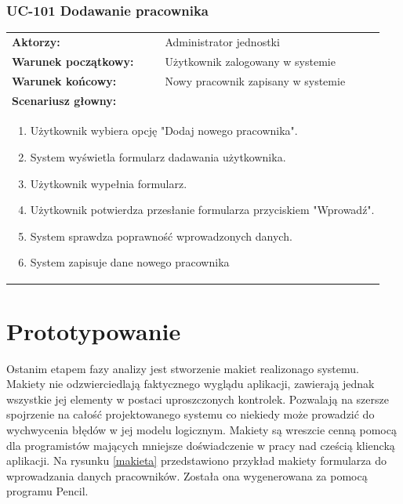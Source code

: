 \subsubsection{UC-101 Dodawanie pracownika}
\begin{tabular}{ll}
	\textbf{Aktorzy:} & Administrator jednostki \\
	
	\textbf{Warunek początkowy:} & Użytkownik zalogowany w systemie \\
	\textbf{Warunek końcowy:} & Nowy pracownik zapisany w systemie \\
	\multicolumn{2}{l}{\textbf{Scenariusz głowny:}}\\
	\multicolumn{2}{l}{
	\begin{minipage}{\textwidth}\begin{enumerate}
		\item Użytkownik wybiera opcję "Dodaj nowego pracownika".
		\item System wyświetla formularz dadawania użytkownika.
		\item Użytkownik wypełnia formularz.
		\item Użytkownik potwierdza przesłanie formularza przyciskiem "Wprowadź".
		\item System sprawdza poprawność wprowadzonych danych.
		\item System zapisuje dane nowego pracownika
	\end{enumerate}\end{minipage}
	}
\end{tabular}
	
\section[Prototypowanie][Prototypowanie]{Prototypowanie}
Ostanim etapem fazy analizy jest stworzenie makiet realizonago systemu. Makiety nie odzwierciedlają faktycznego wyglądu aplikacji, zawierają jednak wszystkie jej elementy w postaci uproszczonych kontrolek. Pozwalają na szersze spojrzenie na całość projektowanego systemu co niekiedy może prowadzić do wychwycenia błędów w jej modelu logicznym. Makiety są wreszcie cenną pomocą dla programistów mających mniejsze doświadczenie w pracy nad cześcią kliencką aplikacji. Na rysunku \ref{makieta} przedstawiono przykład makiety formularza do wprowadzania danych pracowników. Została ona wygenerowana za pomocą programu Pencil.


